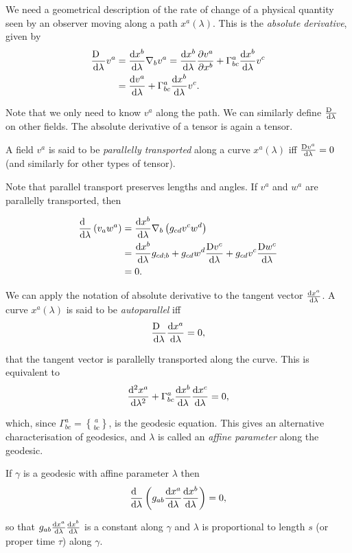 \documentclass{notes}
\newcommand{\dif}[1]{\frac{\ud\phantom{#1}}{\ud#1}}
\newcommand{\absd}[1]{\frac{\uD\phantom{#1}}{\ud#1}}
\newcommand{\absdf}[2]{\frac{\uD#1}{\ud#2}}
\newcommand{\ch}[2]{\genfrac{\{}{\}}{0pt}{}{#1}{#2}}
\newcommand{\del}{\nabla}
\begin{document}
We need a geometrical description of the rate of change of a physical
quantity seen by an observer moving along a path $x^a(\lambda)$.  This
is the \emph{absolute derivative}, given by
\begin{align*}
\absd{\lambda} v^a &= \diff{x^b}{\lambda} \del_b v^a
= \diff{x^b}{\lambda} \pd{v^a}{x^b} + \Gamma^a_{bc}
\diff{x^b}{\lambda} v^c \\
&= \diff{v^a}{\lambda} + \Gamma^a_{bc} \diff{x^b}{\lambda} v^c.
\end{align*}

Note that we only need to know $v^a$ along the path.  We can similarly
define $\absd{\lambda}$ on other fields.  The absolute derivative of a
tensor is again a tensor.

A field $v^a$ is said to be \emph{parallelly transported} along a curve
$x^a(\lambda)$ iff $\absdf{v^a}{\lambda} = 0$ (and similarly for other
types of tensor).

Note that parallel transport preserves lengths and angles.  If $v^a$
and $w^a$ are parallelly transported, then

\begin{align*}
\dif{\lambda} \left( v_a w^a\right)  &= \diff{x^b}{\lambda} \del_b
\left( g_{cd} v^c w^d \right) \\
&= \diff{x^b}{\lambda} g_{cd;b} + g_{cd} w^d \absdf{v^c}{\lambda}
+ g_{cd} v^c \absdf{w^c}{\lambda}\\
& = 0.
\end{align*} 

We can apply the notation of absolute derivative to the tangent vector
$\frac{\mathrm{d} x^a}{\mathrm{d}\lambda}$.  A curve $x^a(\lambda)$ is said to be
\emph{autoparallel} iff
\[
\absd{\lambda} \diff{x^a}{\lambda} = 0,
\]

that the tangent vector is parallelly transported along the curve.
This is equivalent to
\[
\frac{\mathrm{d}^2 x^a}{\mathrm{d}\lambda^2} + \Gamma^a_{bc} \frac{\mathrm{d} x^b}{\mathrm{d}\lambda}
\frac{\mathrm{d} x^c}{\mathrm{d}\lambda} = 0,
\]

which, since $\Gamma^a_{bc} = \ch{a}{bc}$, is the geodesic equation.
This gives an alternative characterisation of geodesics, and $\lambda$
is called an \emph{affine parameter} along the geodesic.

If $\gamma$ is a geodesic with affine parameter $\lambda$ then
\[
\dif{\lambda} \left( g_{ab} \diff{x^a}{\lambda}
  \diff{x^b}{\lambda}\right) = 0,
\]

so that $g_{ab} \frac{\mathrm{d} x^a}{\mathrm{d}\lambda} \frac{\mathrm{d} x^b}{\mathrm{d}\lambda}$ is a constant
along $\gamma$ and $\lambda$ is proportional to length $s$ (or proper
time $\tau$) along $\gamma$.
\end{document}

